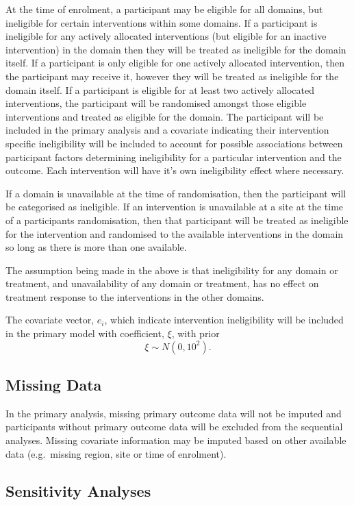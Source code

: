 \documentclass[
  11pt,
]{article}
\begin{document}
At the time of enrolment, a participant may be eligible for all domains, but ineligible for certain interventions within some domains.
If a participant is ineligible for any actively allocated interventions (but eligible for an inactive intervention) in the domain then they will be treated as ineligible for the domain itself.
If a participant is only eligible for one actively allocated intervention, then the participant may receive it, however they will be treated as ineligible for the domain itself.
If a participant is eligible for at least two actively allocated interventions, the participant will be randomised amongst those eligible interventions and treated as eligible for the domain.
The participant will be included in the primary analysis and a covariate indicating their intervention specific ineligibility will be included to account for possible associations between participant factors determining ineligibility for a particular intervention and the outcome.
Each intervention will have it's own ineligibility effect where necessary.

If a domain is unavailable at the time of randomisation, then the participant will be categorised as ineligible.
If an intervention is unavailable at a site at the time of a participants randomisation, then that participant will be treated as ineligible for the intervention and randomised to the available interventions in the domain so long as there is more than one available.

The assumption being made in the above is that ineligibility for any domain or treatment, and unavailability of any domain or treatment, has no effect on treatment response to the interventions in the other domains.

The covariate vector, \(e_i\), which indicate intervention ineligibility will be included in the primary model with coefficient, \(\xi\), with prior
\[
\xi \sim N(0,10^2).
\]

\hypertarget{missing-data}{%
\subsection{Missing Data}\label{missing-data}}

In the primary analysis, missing primary outcome data will not be imputed and participants without primary outcome data will be excluded from the sequential analyses.
Missing covariate information may be imputed based on other available data (e.g.~missing region, site or time of enrolment).

\hypertarget{sensitivity-analyses}{%
\subsection{Sensitivity Analyses}\label{sensitivity-analyses}}
\end{document}
